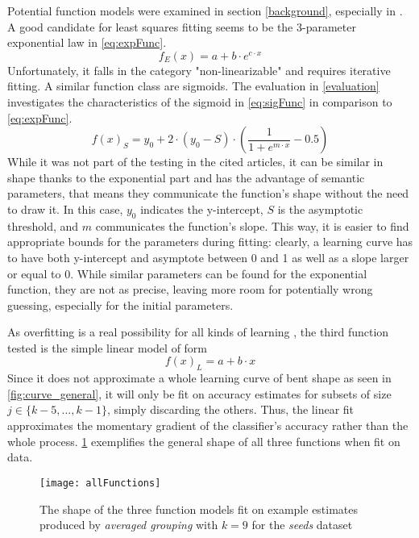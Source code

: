 Potential function models were examined in section \ref{background}, especially in \cite{Singh2005}. A good candidate for least squares fitting seems to be the 3-parameter exponential law in \ref{eq:expFunc}.
\begin{equation}
\label{eq:expFunc}
f_{E}(x) = a + b \cdot e^{c \cdot x}
\end{equation}
Unfortunately, it falls in the category "non-linearizable" and requires iterative fitting. A similar function class are sigmoids. The evaluation in \ref{evaluation} investigates the characteristics of the sigmoid in \ref{eq:sigFunc} in comparison to \ref{eq:expFunc}.
\begin{equation}
\label{eq:sigFunc}
f(x)_{S} = y_0 + 2 \cdot (y_0 - S) \cdot \left( \frac{1}{1+e^{m \cdot x}} - 0.5 \right)
\end{equation}
While it was not part of the testing in the cited articles, it can be similar in shape thanks to the exponential part and has the advantage of semantic parameters, that means they communicate the function's shape without the need to draw it. In this case, $y_0$ indicates the y-intercept, $S$ is the asymptotic threshold, and $m$ communicates the function's slope. This way, it is easier to find appropriate bounds for the parameters during fitting: clearly, a learning curve has to have both y-intercept and asymptote between 0 and 1 as well as a slope larger or equal to 0. While similar parameters can be found for the exponential function, they are not as precise, leaving more room for potentially wrong guessing, especially for the initial parameters.

As overfitting is a real possibility for all kinds of learning \cite{Dietterich1995}, the third function tested is the simple linear model of form
\begin{equation}
\label{eq:linFunc}
f(x)_{L} = a + b \cdot x
\end{equation}
Since it does not approximate a whole learning curve of bent shape as seen in \ref{fig:curve_general}, it will only be fit on accuracy estimates for subsets of size $j \in \{k-5,...,k-1\}$, simply discarding the others. Thus, the linear fit approximates the momentary gradient of the classifier's accuracy rather than the whole process. \ref{fig:allFunctions} exemplifies the general shape of all three functions when fit on data.

\begin{figure}[h]
	\centering
	\texttt{[image: allFunctions]}
	\caption{The shape of the three function models fit on example estimates produced by \textit{averaged grouping} with $k = 9$ for the \textit{seeds} dataset}
	\label{fig:allFunctions}
\end{figure}

